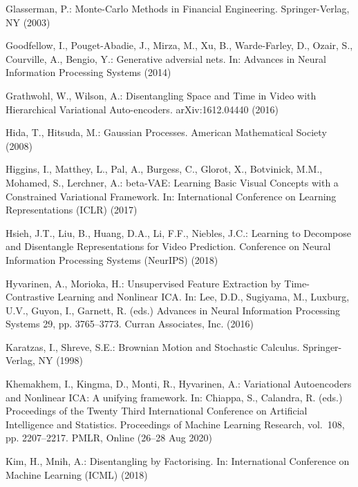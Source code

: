 \documentclass[runningheads]{llncs}
\begin{document}
\begin{thebibliography}{10}
	Glasserman, P.: Monte-{C}arlo {M}ethods in {F}inancial {E}ngineering.
	Springer-Verlag, NY (2003)
	
	Goodfellow, I., Pouget-Abadie, J., Mirza, M., Xu, B., Warde-Farley, D., Ozair,
	S., Courville, A., Bengio, Y.: Generative adversial nets. In: Advances in
	Neural Information Processing Systems (2014)
	
	Grathwohl, W., Wilson, A.: Disentangling {S}pace and {T}ime in {V}ideo with
	{H}ierarchical {V}ariational {A}uto-encoders. arXiv:1612.04440  (2016)
	
	Hida, T., Hitsuda, M.: Gaussian {P}rocesses. American Mathematical Society
	(2008)
	
	Higgins, I., Matthey, L., Pal, A., Burgess, C., Glorot, X., Botvinick, M.M.,
	Mohamed, S., Lerchner, A.: beta-{V}{A}{E}: {L}earning {B}asic {V}isual
	{C}oncepts with a {C}onstrained {V}ariational {F}ramework. In: International
	Conference on Learning Representations (ICLR) (2017)
	
	Hsieh, J.T., Liu, B., Huang, D.A., Li, F.F., Niebles, J.C.: Learning to
	{D}ecompose and {D}isentangle {R}epresentations for {V}ideo {P}rediction.
	Conference on Neural Information Processing Systems (NeurIPS)  (2018)
	
	Hyvarinen, A., Morioka, H.: Unsupervised {F}eature {E}xtraction by
	{T}ime-{C}ontrastive {L}earning and {N}onlinear {ICA}. In: Lee, D.D.,
	Sugiyama, M., Luxburg, U.V., Guyon, I., Garnett, R. (eds.) Advances in Neural
	Information Processing Systems 29, pp. 3765--3773. Curran Associates, Inc.
	(2016)
	
	Karatzas, I., Shreve, S.E.: Brownian {M}otion and {S}tochastic {C}alculus.
	Springer-Verlag, NY (1998)
	
	Khemakhem, I., Kingma, D., Monti, R., Hyvarinen, A.: Variational {A}utoencoders
	and {N}onlinear {ICA}: A unifying framework. In: Chiappa, S., Calandra, R.
	(eds.) Proceedings of the Twenty Third International Conference on Artificial
	Intelligence and Statistics. Proceedings of Machine Learning Research,
	vol.~108, pp. 2207--2217. PMLR, Online (26--28 Aug 2020)
	
	Kim, H., Mnih, A.: Disentangling by {F}actorising. In: International Conference
	on Machine Learning (ICML) (2018)
	

\end{thebibliography}
\end{document}
